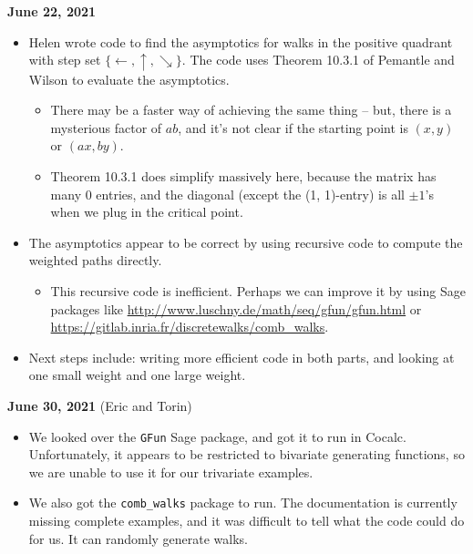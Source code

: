 \documentclass[letterpaper]{article}
\begin{document}
{\bf June 22, 2021}
\begin{itemize}
\item Helen wrote code to find the asymptotics for walks in the positive quadrant with step set $\{\leftarrow, \uparrow, \searrow\}$.  The code uses Theorem 10.3.1 of Pemantle and Wilson to evaluate the asymptotics.
\begin{itemize}
\item There may be a faster way of achieving the same thing -- but, there is a mysterious factor of $ab$, and it's not clear if the starting point is $(x, y)$ or $(ax, by)$.
\item Theorem 10.3.1 does simplify massively here, because the matrix has many 0 entries, and the diagonal (except the (1, 1)-entry) is all $\pm1$'s when we plug in the critical point.
\end{itemize}
\item The asymptotics appear to be correct by using recursive code to compute the weighted paths directly.
\begin{itemize}
\item This recursive code is inefficient.  Perhaps we can improve it by using Sage packages like \url{http://www.luschny.de/math/seq/gfun/gfun.html} or \url{https://gitlab.inria.fr/discretewalks/comb_walks}.
\end{itemize}
\item Next steps include: writing more efficient code in both parts, and looking at one small weight and one large weight.
\end{itemize}

\newpage

{\bf June 30, 2021} (Eric and Torin)
\begin{itemize}
\item We looked over the \texttt{GFun} Sage package, and got it to run in Cocalc.  Unfortunately, it appears to be restricted to bivariate generating functions, so we are unable to use it for our trivariate examples.
\item We also got the \texttt{comb\_walks} package to run.  The documentation is currently missing complete examples, and it was difficult to tell what the code could do for us.  It can randomly generate walks.
\end{itemize}
\end{document}
